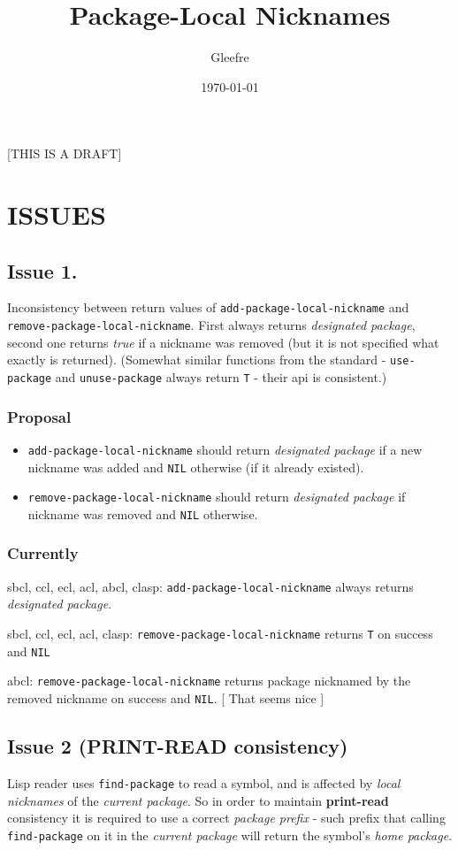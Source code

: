 \documentclass[11pt]{article}
\author{Gleefre}
\date{\today}
\title{Package-Local Nicknames}
\begin{document}
\maketitle
\tableofcontents

[THIS IS A DRAFT]

\section{ISSUES}
\label{sec:orgfe5250b}
\subsection{Issue 1.}
\label{sec:org24771a2}
Inconsistency between return values of \texttt{add-package-local-nickname} and
\texttt{remove-package-local-nickname}. First always returns \emph{designated package},
second one returns \emph{true} if a nickname was removed (but it is not specified
what exactly is returned). (Somewhat similar functions from the standard -
\texttt{use-package} and \texttt{unuse-package} always return \texttt{T} - their api is
consistent.)
\subsubsection{Proposal}
\label{sec:orgc72ed94}
\begin{itemize}
\item \texttt{add-package-local-nickname} should return \emph{designated package} if a new
nickname was added and \texttt{NIL} otherwise (if it already existed).
\item \texttt{remove-package-local-nickname} should return \emph{designated package} if
nickname was removed and \texttt{NIL} otherwise.
\end{itemize}
\subsubsection{Currently}
\label{sec:org7a605f4}
sbcl, ccl, ecl, acl, abcl, clasp: \texttt{add-package-local-nickname} always returns
\emph{designated package}.

sbcl, ccl, ecl, acl, clasp: \texttt{remove-package-local-nickname} returns \texttt{T} on
success and \texttt{NIL}

abcl: \texttt{remove-package-local-nickname} returns package nicknamed by the
removed nickname on success and \texttt{NIL}.  [ That seems nice ]
\subsection{Issue 2 (PRINT-READ consistency)}
\label{sec:orga89533d}
Lisp reader uses \texttt{find-package} to read a symbol, and is affected by \emph{local
nicknames} of the \emph{current package}. So in order to maintain \textbf{print-read}
consistency it is required to use a correct \emph{package prefix} - such prefix
that calling \texttt{find-package} on it in the \emph{current package} will return the
symbol's \emph{home package}.
\end{document}
